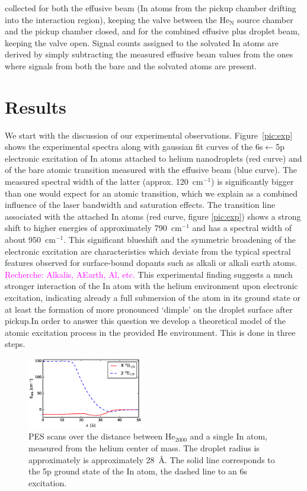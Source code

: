 \documentclass[twoside,twocolumn,9pt]{article}
\def\hl#1{\textcolor{magenta}{#1}}  %
\begin{document}
collected for both the effusive beam (In atoms from the pickup chamber drifting into the interaction region), keeping the valve between the He$_\mathrm{N}$ source chamber and the pickup chamber closed, and for the combined effusive plus droplet beam, keeping the valve open. Signal counts assigned to the solvated In atoms are derived by simply subtracting the measured effusive beam values from the ones where signals from both the bare and the solvated atoms are present. 

\section{Results}
We start with the discussion of our experimental observations. Figure~\ref{pic:exp} shows the experimental spectra along with gaussian fit curves of the 6s$\leftarrow{}$5p electronic excitation of In atoms attached to helium nanodroplets (red curve) and of the bare atomic transition measured with the effusive beam (blue curve). The measured spectral width of the latter (approx. 120~cm$^{-1}$) is significantly bigger than one would expect for an atomic transition, which we explain as a combined influence of the laser bandwidth and saturation effects. The transition line associated with the attached In atoms (red curve, figure \ref{pic:exp}) shows a strong shift to higher energies of approximately 790~cm$^{-1}$ and has a spectral width of about 950~cm$^{-1}$. This significant blueshift and the symmetric broadening of the electronic excitation are characteristics which deviate from the typical spectral features observed for surface-bound dopants such as alkali or alkali earth atoms. \hl{Recherche: Alkalis, AEarth, Al, etc.} This experimental finding suggests a much stronger interaction of the In atom with the helium environment upon electronic excitation, indicating already a full submersion of the atom in its ground state or at least the formation of  more pronounced `dimple' on the droplet surface after pickup.In order to answer this question we develop a theoretical model of the atomic excitation process in the provided He environment. This is done in three steps.

\begin{figure}[htbp!]
  	\begin{center}
 		\includegraphics[width=0.45\textwidth]{3.eps}
                \caption{PES scans over the distance between He$_{2000}$ and a single In atom, measured from the helium center of mass. The droplet radius is approximately is approximately 28~\AA. The solid line corresponds to the 5p ground state of the In atom, the dashed line to an 6s excitation.\label{pic:scan}}
  	\end{center}
\end{figure}
\end{document}
